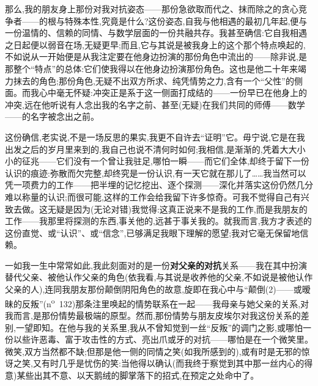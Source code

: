 \asterisms

\dmark{}那么,我的朋友身上那份对我对抗姿态——那份急欲取而代之、抹而除之的贪心竞争者——的根与特殊本性,究竟是什么?这份姿态,自我与他相遇的最初几年起,便与一份温情的、信赖的同情、与数学层面的一份共融共存。我甚至确信:它自我相遇之日起便以弱音在场,无疑更早;而且,它与其说是被我身上的这个那个特点唤起的,不如说从一开始便是从我注定要在他身边扮演的那份角色中流出的——除非说,是那整个“特点”的总体:它们使我得以在他身边扮演那份角色。这也是他二十年来竭力抹去的角色;那份角色,无疑不出双方所求、纯凭情势之力,含有一个“父性”的侧面。而我心中毫无怀疑:冲突正是系于这一侧面打成结的——一份早已在他身上的冲突,远在他听说有人念出我的名字之前、甚至(无疑)在我们共同的师傅——数学——的名字被念出之前。

这份确信,老实说,不是一场反思的果实,我更不自许去“证明”它。毋宁说,它是在我出发之后的岁月里来到的,我自己也说不清何时如何;我相信,是渐渐的,凭着大大小小的征兆——它们没有一个曾让我驻足,哪怕一瞬——而它们全体,却终于留下一份认识的痕迹:弥散而欠完整,却终究是一份认识,有一天它就在那儿了……我当然可以凭一项费力的工作——把半埋的记忆挖出、逐个探测——深化并落实这份仍然几分难以称量的认识;而很可能,这样的工作会给我留下许多惊奇。可我不觉得自己有兴致去做。这无疑是因为(无论对错)我觉得:这真正说来不是我的工作,而是我朋友的工作——我那里将探测的东西,事关他的,远甚于事关我的。就我而言,我方才表述的这份直觉、或“认识”、或“信念”,已够满足我眼下理解的愿望;我对它毫无保留地信赖。

一如我一生中常常如此,我此刻面对的是一份\dmark{}\textbf{对父亲的对抗}关系——我在其中扮演替代父亲、被他认作父亲的角色(依我看,与其说是收养他的父亲,不如说是被他认作父亲的人),连同我朋友那份颠倒阴阳角色的故意,旋即在我心中与“颠倒(2)——或暧昧的反叛”(n\textsuperscript{o}~132)那条注里唤起的情势联系在一起——我母亲与她父亲的关系,对我而言,是那份情势最极端的原型。然而,那份情势与朋友皮埃尔对我这份关系的差别,一望即知。在他与我的关系里,我从不曾知觉到一丝“反叛”的调门之影,或哪怕一份以些许恶毒、富于攻击性的方式、亮出爪或牙的对抗——哪怕是在一个微笑里。微笑,双方当然都不缺;但那是他一侧的同情之笑(如我所感到的),或有时是无邪的惊讶之笑,又有时几乎是忧伤的笑:当他得以确认(而我终于察觉到其中那一丝内心的得意)某些出其不意、以天鹅绒的脚掌落下的招式,在预定之处命中了。


